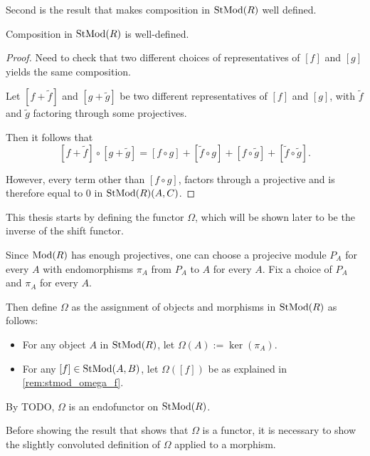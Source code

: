 Second is the result that makes composition in \( \operatorname{StMod}(R) \) well defined.

\begin{lemma}
    \label{lem:stmod_composition_well-defined}
    Composition in \( \operatorname{StMod}(R) \) is well-defined.
\end{lemma}
\begin{proof}
    Need to check that two different choices of representatives of \( [f] \) and \( [g] \) yields the same composition.

    Let \( [f + \widetilde{f}] \) and \( [g + \widetilde{g}] \) be two different representatives of \( [f] \) and \( [g] \), with \( \widetilde{f} \) and \( \widetilde{g} \) factoring through some projectives.

    Then it follows that
    \[
        [f + \widetilde{f}] \circ [g + \widetilde{g}] = [f \circ g] + [\widetilde{f} \circ g] + [f \circ \widetilde{g}] + [\widetilde{f} \circ \widetilde{g}].
    \]
    
    However, every term other than \( [f \circ g] \), factors through a projective and is therefore equal to \( 0 \) in \( \operatorname{StMod}(R)(A, C) \).
\end{proof}

This thesis starts by defining the functor \( \Omega \), which will be shown later to be the inverse of the shift functor.

\begin{definition}
    Since \( \operatorname{Mod}(R) \) has enough projectives, one can choose a projecive module \( P_A \) for every \( A \) with endomorphisms \( \pi_A \) from \( P_A \) to \( A \) for every \( A \). Fix a choice of \( P_A \) and \( \pi_A \) for every \( A \).

    Then define \( \Omega \) as the assignment of objects and morphisms in \( \operatorname{StMod}(R) \) as follows:
    \begin{itemize}
        \item For any object \( A \) in \( \operatorname{StMod}(R) \), let \( \Omega(A) := \ker(\pi_A) \).
        \item For any \( [f] \in \operatorname{StMod}(A, B) \), let \( \Omega([f]) \) be as explained in \autoref{rem:stmod_omega_f}.
    \end{itemize}

    By TODO, \( \Omega \) is an endofunctor on \( \operatorname{StMod}(R) \).
\end{definition}

Before showing the result that shows that \( \Omega \) is a functor, it is necessary to show the slightly convoluted definition of \( \Omega \) applied to a morphism.

